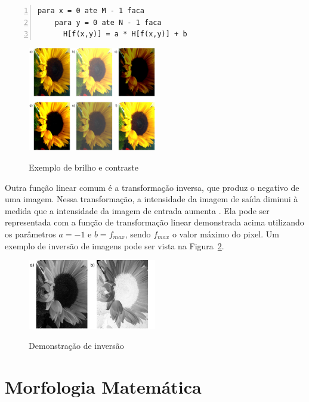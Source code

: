 \documentclass[12pt,oneside,a4paper,english,french,spanish,brazil,]{abntex2}
\begin{document}
\begin{lstlisting}[caption={Algoritmo para aplicação de brilho e contraste}, label=alg:Brilho_Contraste, numbers=left]
para x = 0 ate M - 1 faca
    para y = 0 ate N - 1 faca
      H[f(x,y)] = a * H[f(x,y)] + b
\end{lstlisting}

\begin{figure}[ht]
\centering
\caption{Exemplo de brilho e contraste}
\includegraphics[width=0.5\textwidth]{imagens/PDI_Brilho_e_Contraste.pdf}
\sourceAuthor
\label{fig:PDI_Brilho_e_Contraste}
\end{figure}

Outra função linear comum é a transformação inversa, que produz o negativo de uma imagem. Nessa transformação, a intensidade da imagem de saída diminui à medida que a intensidade da imagem de entrada aumenta \cite{pedrini:2008}. Ela pode ser representada com a função de transformação linear demonstrada acima utilizando os parâmetros \(a=-1\) e \(b=f_{max}\), sendo \(f_{max}\) o valor máximo do pixel. Um exemplo de inversão de imagens pode ser vista na Figura~\ref{fig:PDI_Inversao}.

\begin{figure}[ht]
\centering
\caption{Demonstração de inversão}
\includegraphics[width=0.5\textwidth]{imagens/PDI_Inversao.pdf}
\sourceAuthor
\label{fig:PDI_Inversao}
\end{figure}

\section{Morfologia Matemática}
\end{document}
